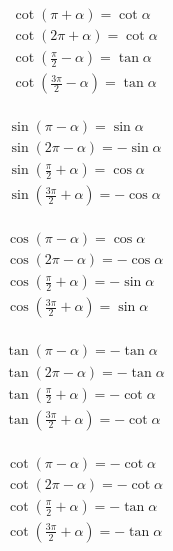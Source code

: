 \documentclass[a4paper, fleqn, fontset = mac]{ctexart}
\begin{document}
\begin{multicols}{2}
\begin{multicols}{2}[\setlength{\columnseprule}{0pt}\setlength{\columnseprule}{0pt}]
			\begin{align*}
			& \cot\left( \pi + \alpha \right) = \cot\alpha \\
			& \cot\left( 2\pi + \alpha \right) = \cot\alpha \\
			& \cot\left( \frac\pi2 - \alpha \right) = \tan\alpha \\
			& \cot\left( \frac{3\pi}2 - \alpha \right) = \tan\alpha \\
			\end{align*}
			
			\begin{align*}
			& \sin\left( \pi - \alpha \right) = \sin\alpha \\
			& \sin\left( 2\pi - \alpha \right) = -\sin\alpha \\
			& \sin\left( \frac\pi2 + \alpha \right) = \cos\alpha \\
			& \sin\left( \frac{3\pi}2 + \alpha \right) = -\cos\alpha \\
			\end{align*}
			
			\begin{align*}
			& \cos\left( \pi - \alpha \right) = \cos\alpha \\
			& \cos\left( 2\pi - \alpha \right) = -\cos\alpha \\
			& \cos\left( \frac\pi2 + \alpha \right) = -\sin\alpha \\
			& \cos\left( \frac{3\pi}2 + \alpha \right) = \sin\alpha \\
			\end{align*}
			
			\begin{align*}
			& \tan\left( \pi - \alpha \right) = -\tan\alpha \\
			& \tan\left( 2\pi - \alpha \right) = -\tan\alpha \\
			& \tan\left( \frac\pi2 + \alpha \right) = -\cot\alpha \\
			& \tan\left( \frac{3\pi}2 + \alpha \right) = -\cot\alpha \\
			\end{align*}
			
			\begin{align*}		
			& \cot\left( \pi - \alpha \right) = -\cot\alpha \\
			& \cot\left( 2\pi - \alpha \right) = -\cot\alpha \\
			& \cot\left( \frac\pi2 + \alpha \right) = -\tan\alpha \\
			& \cot\left( \frac{3\pi}2 + \alpha \right) = -\tan\alpha \\
			\end{align*}
			

\end{multicols}
\end{multicols}
\end{document}
